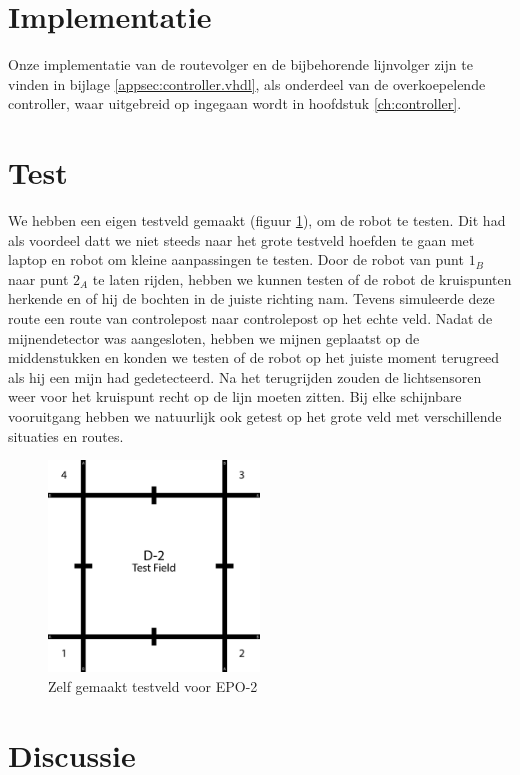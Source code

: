 \documentclass{report}
\begin{document}
\section{Implementatie}
Onze implementatie van de routevolger en de bijbehorende lijnvolger zijn te vinden in bijlage \ref{appsec:controller.vhdl}, als onderdeel van de overkoepelende controller, waar uitgebreid op ingegaan wordt in hoofdstuk \ref{ch:controller}.

\section{Test}
We hebben een eigen testveld gemaakt (figuur \ref{fig:testfield}), om de robot te testen. Dit had als voordeel datt we niet steeds naar het grote testveld hoefden te gaan met laptop en robot om kleine aanpassingen te testen.
Door de robot van punt $1_B$ naar punt $2_A$ te laten rijden, hebben we kunnen testen of de robot de kruispunten herkende en of hij de bochten in de juiste richting nam. Tevens simuleerde deze route een route van controlepost naar controlepost op het echte veld.
Nadat de mijnendetector was aangesloten, hebben we mijnen geplaatst op de middenstukken en konden we testen of de robot op het juiste moment terugreed als hij een mijn had gedetecteerd. Na het terugrijden zouden de lichtsensoren weer voor het kruispunt recht op de lijn moeten zitten.
Bij elke schijnbare vooruitgang hebben we natuurlijk ook getest op het grote veld met verschillende situaties en routes.

\begin{figure}[H]
	\centering
	\includegraphics[width=0.5\textwidth]{d-2_test_field.png}
	\caption{Zelf gemaakt testveld voor EPO-2}
	\label{fig:testfield}
\end{figure}

\section{Discussie}
\end{document}
